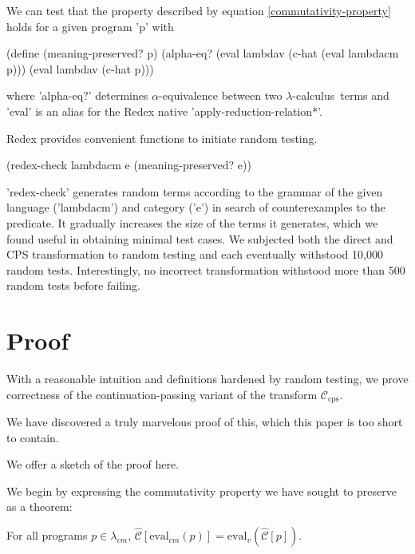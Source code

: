 \documentclass{llncs}
\newcommand{\lc}[0]{$\lambda$-calculus}
\newcommand{\Ch}[1]{\hat{\mathcal{C}}[#1]}
\begin{document}

We can test that the property described by equation \ref{commutativity-property} holds for a given program \scheme'p' with 
\begin{schemedisplay}
(define (meaning-preserved? p)
  (alpha-eq? (eval lambdav (c-hat (eval lambdacm p))) (eval lambdav (c-hat p)))
\end{schemedisplay}
where \scheme'alpha-eq?' determines $\alpha$-equivalence between two \lc\ terms and \scheme'eval' is an alias for the Redex native \scheme'apply-reduction-relation*'.

Redex provides convenient functions to initiate random testing.

\begin{schemedisplay}
(redex-check lambdacm e (meaning-preserved? e))
\end{schemedisplay}

\scheme'redex-check' generates random terms according to the grammar of the given language (\scheme'lambdacm') and category (\scheme'e') in search of counterexamples to the predicate. It gradually increases the size of the terms it generates, which we found useful in obtaining minimal test cases. We subjected both the direct and CPS transformation to random testing and each eventually withstood 10,000 random tests. Interestingly, no incorrect transformation withstood more than 500 random tests before failing.

\section{Proof}
\label{sec-proof}

With a reasonable intuition and definitions hardened by random testing, we prove correctness of the continuation-passing variant of the transform $\mathcal{C}_{\mathrm{cps}}$.

We have discovered a truly marvelous proof of this, which this paper is too short to contain.

We offer a sketch of the proof here.

We begin by expressing the commutativity property we have sought to preserve as a theorem:

\begin{theorem}
For all programs $p\in\lambda_{cm}$, $\Ch{\mathrm{eval}_{cm}(p)}=\mathrm{eval}_{v}(\Ch{p})$.
\end{theorem}
\end{document}
